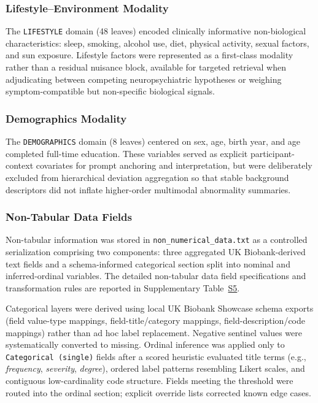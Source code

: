 \documentclass[11pt,a4paper,twoside]{article}
\begin{document}
\subsubsection{Lifestyle--Environment Modality}
The \texttt{LIFESTYLE} domain (48 leaves) encoded clinically informative non-biological characteristics: sleep, smoking, alcohol use, diet, physical activity, sexual factors, and sun exposure. Lifestyle factors were represented as a first-class modality rather than a residual nuisance block, available for targeted retrieval when adjudicating between competing neuropsychiatric hypotheses or weighing symptom-compatible but non-specific biological signals.

\subsubsection{Demographics Modality}
The \texttt{DEMOGRAPHICS} domain (8 leaves) centered on sex, age, birth year, and age completed full-time education. These variables served as explicit participant-context covariates for prompt anchoring and interpretation, but were deliberately excluded from hierarchical deviation aggregation so that stable background descriptors did not inflate higher-order multimodal abnormality summaries.

\subsubsection{Non-Tabular Data Fields}
Non-tabular information was stored in \texttt{non\_{\allowbreak}numerical\_{\allowbreak}data.{\allowbreak}txt} as a controlled serialization comprising two components: three aggregated UK Biobank-derived text fields and a schema-informed categorical section split into nominal and inferred-ordinal variables. The detailed non-tabular data field specifications and transformation rules are reported in Supplementary Table~\hyperref[tab:s5]{S5}.

Categorical layers were derived using local UK Biobank Showcase schema exports (field value-type mappings, field-title/category mappings, field-description/code mappings) rather than ad hoc label replacement. Negative sentinel values were systematically converted to missing. Ordinal inference was applied only to \texttt{Categorical (single)} fields after a scored heuristic evaluated title terms (e.g., \textit{frequency}, \textit{severity}, \textit{degree}), ordered label patterns resembling Likert scales, and contiguous low-cardinality code structure. Fields meeting the threshold were routed into the ordinal section; explicit override lists corrected known edge cases.
\end{document}
